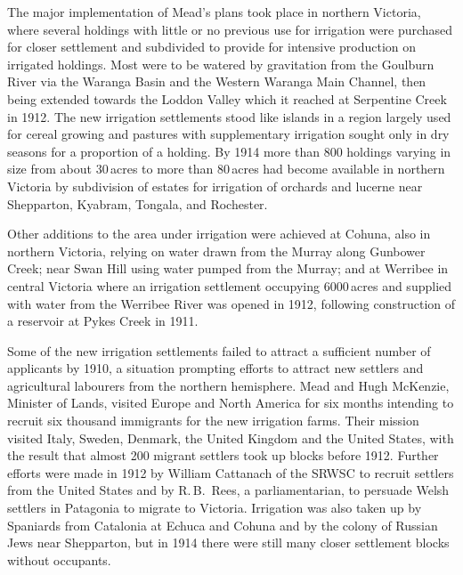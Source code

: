 The major implementation of Mead's plans took place in northern
Victoria, where several holdings with little or no previous use for
irrigation were purchased for closer settlement and subdivided to
provide for intensive production on irrigated holdings.  Most were to
be watered by gravitation from the Goulburn River via the Waranga
Basin and the Western Waranga Main Channel, then being extended towards the Loddon Valley which it
reached at Serpentine Creek  in 1912.  The new
irrigation settlements stood like islands in a region largely used for
cereal growing and pastures with supplementary
irrigation sought only in dry seasons for a proportion of a holding.
By 1914 more than 800 holdings varying in size from about 30\,acres to
more than 80\,acres had become available in northern Victoria by
subdivision of estates for irrigation of orchards and
lucerne near Shepparton, Kyabram, Tongala, and
Rochester.

Other additions to the area under irrigation were achieved at Cohuna,
also in northern Victoria, relying on water drawn from the Murray
along Gunbower Creek; near Swan Hill using water
pumped from the Murray; and at Werribee in central
Victoria where an irrigation settlement occupying 6000\,acres and
supplied with water from the Werribee River was
opened in 1912, following construction of a reservoir at
Pykes Creek in 1911.

Some of the new irrigation settlements failed to attract a sufficient
number of applicants by 1910, a situation prompting efforts to attract
new settlers and agricultural labourers from the northern hemisphere.
Mead and Hugh McKenzie, Minister of Lands, visited
Europe and Nor\-th America for six months
intending to recruit six thousand immigrants for the new irrigation
farms. Their mission visited \index{Italy}Italy, \index{Sweden}Sweden,
\index{Denmark}Denmark, the \index{Britain}United Kingdom and the
\index{USA}United States, with the result that almost 200 migrant
settlers took up blocks before 1912.  Further efforts were made in
1912 by William \index{Cattanach, W.}Cattanach of the SRWSC to recruit
settlers from the United States and by R.\,B.~Rees, a parliamentarian,
to persuade \index{Welsh}Welsh settlers in Patagonia to migrate to
Victoria.  Irrigation was also taken up by \index{Spanish}Spaniards
from Catalonia at Echuca and Cohuna and by the colony of
Russian Jews near Shepparton, but in 1914 there were
still many closer settlement blocks without occupants.

